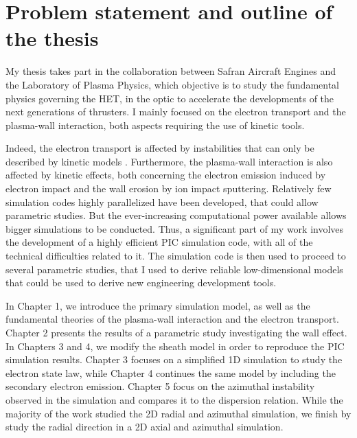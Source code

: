 
\section*{Problem statement and outline of the thesis}
\label{sec-problematic}

My thesis takes part in the collaboration between Safran Aircraft Engines and the Laboratory of Plasma Physics, which objective is to study the fundamental physics governing the \ac{HET}, in the optic to accelerate the developments of the next generations of thrusters.
I mainly focused on the electron transport and the plasma-wall interaction,
both aspects requiring the use of kinetic tools.

Indeed, the electron transport is affected by instabilities that can only be described by kinetic models \citep{adam2008a,lafleur2016a}.
Furthermore, the plasma-wall interaction is also affected by kinetic effects, both concerning the electron emission induced by electron impact \citep{barral2003a,raitses2011,sydorenko2006} and the wall erosion by ion impact sputtering.
Relatively few simulation codes highly parallelized have been developed, that could allow parametric studies.
But the ever-increasing computational power available allows bigger simulations to be conducted.
Thus, a significant part of my work involves the development of a highly efficient \ac{PIC} simulation code, with all of the technical difficulties related to it.
The simulation code is then used to proceed to several parametric studies, that I used to derive reliable low-dimensional models that could be used to derive new engineering development tools.


\vspace{1em}
In Chapter 1, we introduce the primary simulation model, as well as the fundamental theories of the plasma-wall interaction and the electron transport.
Chapter 2 presents the results of a parametric study investigating the wall effect.
In Chapters 3 and 4, we modify the sheath model in order to reproduce the \ac{PIC} simulation results.
Chapter 3 focuses on a simplified \ac{1D} simulation to study the electron state law, while Chapter 4 continues the same model by including the secondary electron emission.
Chapter 5 focus on the azimuthal instability observed in the simulation and compares it to the dispersion relation.
While the majority of the work studied the \ac{2D} radial and azimuthal simulation, we finish by study the radial direction in a \ac{2D} axial and azimuthal simulation.
